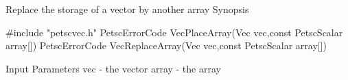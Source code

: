 Replace the storage of a vector by another array
Synopsis

#include "petscvec.h"   
PetscErrorCode  VecPlaceArray(Vec vec,const PetscScalar array[])
PetscErrorCode  VecReplaceArray(Vec vec,const PetscScalar array[])

Input Parameters
vec   - the vector
array - the array 
